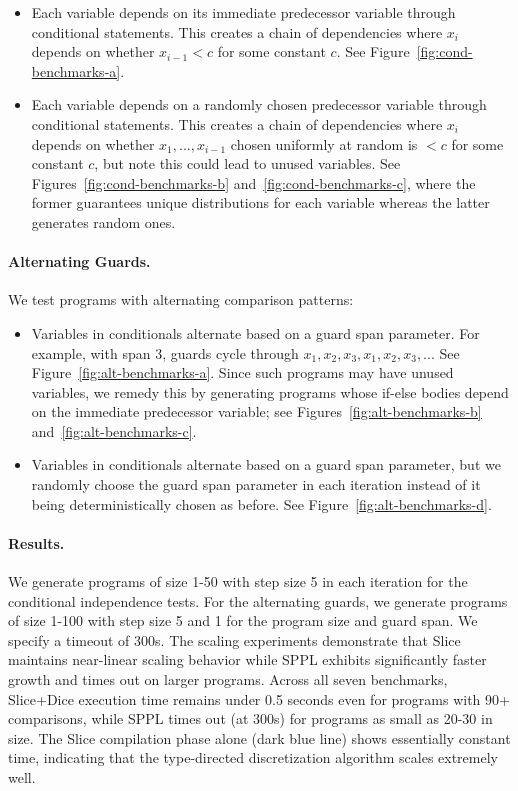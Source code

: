 \begin{itemize}
\item Each variable depends on its immediate predecessor variable through conditional statements. This creates a chain of dependencies where $x_i$ depends on whether $x_{i-1} < c$ for some constant $c$. See Figure~\ref{fig:cond-benchmarks-a}.
\item Each variable depends on a randomly chosen predecessor variable through conditional statements. This creates a chain of dependencies where $x_i$ depends on whether $x_1, ..., x_{i-1}$ chosen uniformly at random is $< c$ for some constant $c$, but note this could lead to unused variables. See Figures~\ref{fig:cond-benchmarks-b} and~\ref{fig:cond-benchmarks-c}, where the former guarantees unique distributions for each variable whereas the latter generates random ones.
\end{itemize}



\paragraph{Alternating Guards.}
We test programs with alternating comparison patterns:

\begin{itemize}
\item Variables in conditionals alternate based on a guard span parameter. For example, with span 3, guards cycle through $x_1, x_2, x_3, x_1, x_2, x_3, ...$ See Figure~\ref{fig:alt-benchmarks-a}. Since such programs may have unused variables, we remedy this by generating programs whose if-else bodies depend on the immediate predecessor variable; see Figures~\ref{fig:alt-benchmarks-b} and~\ref{fig:alt-benchmarks-c}.

\item Variables in conditionals alternate based on a guard span parameter, but we randomly choose the guard span parameter in each iteration instead of it being deterministically chosen as before. See Figure~\ref{fig:alt-benchmarks-d}.
\end{itemize}



\paragraph{Results.} We generate programs of size 1-50 with step size 5 in each iteration for the conditional independence tests. For the alternating guards, we generate programs of size 1-100 with step size 5 and 1 for the program size and guard span. We specify a timeout of 300s. The scaling experiments demonstrate that Slice maintains near-linear scaling behavior while SPPL exhibits significantly faster growth and times out on larger programs. Across all seven benchmarks, Slice+Dice execution time remains under 0.5 seconds even for programs with 90+ comparisons, while SPPL times out (at 300s) for programs as small as 20-30 in size. The Slice compilation phase alone (dark blue line) shows essentially constant time, indicating that the type-directed discretization algorithm scales extremely well.

